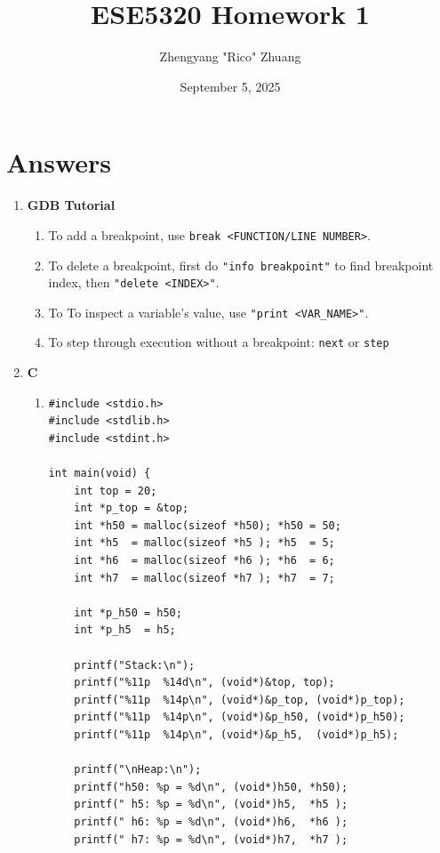 \documentclass[12pt]{article}
\title{ESE5320 Homework 1}
\author{Zhengyang "Rico" Zhuang}
\date{September 5, 2025}
\begin{document}
\maketitle

\section*{Answers}

\begin{enumerate}
    \item \textbf{GDB Tutorial}
    \begin{enumerate}[label=\arabic*)]
        \item To add a breakpoint, use \texttt{break <FUNCTION/LINE NUMBER>}.
        
        \item To delete a breakpoint, first do \texttt{"info breakpoint"} to find breakpoint index, then \texttt{"delete <INDEX>"}.
        \item To To inspect a variable's value, use \texttt{"print <VAR\_NAME>"}.
        
        \item To step through execution without a breakpoint: \texttt{next} or \texttt{step}

    \end{enumerate}

    \item  \textbf{C}
    \begin{enumerate}[label=\arabic*)]
        \item \begin{verbatim}
#include <stdio.h>
#include <stdlib.h>
#include <stdint.h>

int main(void) {
    int top = 20;
    int *p_top = &top;
    int *h50 = malloc(sizeof *h50); *h50 = 50;
    int *h5  = malloc(sizeof *h5 ); *h5  = 5;
    int *h6  = malloc(sizeof *h6 ); *h6  = 6;
    int *h7  = malloc(sizeof *h7 ); *h7  = 7;

    int *p_h50 = h50;
    int *p_h5  = h5;

    printf("Stack:\n");
    printf("%11p  %14d\n", (void*)&top, top);
    printf("%11p  %14p\n", (void*)&p_top, (void*)p_top);
    printf("%11p  %14p\n", (void*)&p_h50, (void*)p_h50);
    printf("%11p  %14p\n", (void*)&p_h5,  (void*)p_h5);

    printf("\nHeap:\n");
    printf("h50: %p = %d\n", (void*)h50, *h50);
    printf(" h5: %p = %d\n", (void*)h5,  *h5 );
    printf(" h6: %p = %d\n", (void*)h6,  *h6 );
    printf(" h7: %p = %d\n", (void*)h7,  *h7 );


\end{verbatim}
\end{enumerate}
\end{enumerate}
\end{document}
